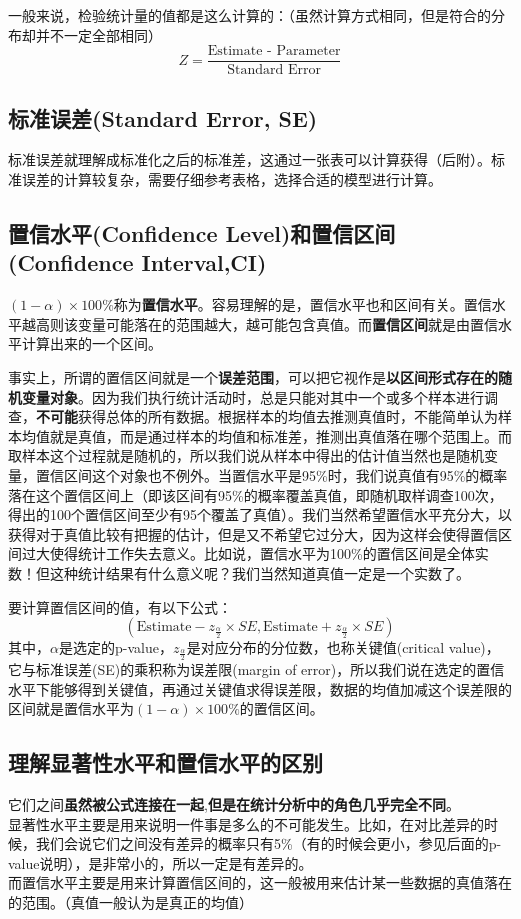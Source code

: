 \documentclass[UTF8]{ctexbook}
\begin{document}
一般来说，检验统计量的值都是这么计算的：（虽然计算方式相同，但是符合的分布却并不一定全部相同）
\[
Z=\frac{\text{Estimate\ -\ Parameter}}{\text{Standard Error}}
\]
\subsection{标准误差(Standard Error, SE)}
标准误差就理解成标准化之后的标准差，这通过一张表可以计算获得（后附）。标准误差的计算较复杂，需要仔细参考表格，选择合适的模型进行计算。
\subsection{置信水平(Confidence Level)和置信区间(Confidence Interval,CI)}
$(1-\alpha)\times 100\%$称为\textbf{置信水平}。容易理解的是，置信水平也和区间有关。置信水平越高则该变量可能落在的范围越大，越可能包含真值。而\textbf{置信区间}就是由置信水平计算出来的一个区间。

事实上，所谓的置信区间就是一个\textbf{误差范围}，可以把它视作是\textbf{以区间形式存在的随机变量对象}。因为我们执行统计活动时，总是只能对其中一个或多个样本进行调查，\textbf{不可能}获得总体的所有数据。根据样本的均值去推测真值时，不能简单认为样本均值就是真值，而是通过样本的均值和标准差，推测出真值落在哪个范围上。而取样本这个过程就是随机的，所以我们说从样本中得出的估计值当然也是随机变量，置信区间这个对象也不例外。当置信水平是95\%时，我们说真值有95\%的概率落在这个置信区间上（即该区间有95\%的概率覆盖真值，即随机取样调查100次，得出的100个置信区间至少有95个覆盖了真值）。我们当然希望置信水平充分大，以获得对于真值比较有把握的估计，但是又不希望它过分大，因为这样会使得置信区间过大使得统计工作失去意义。比如说，置信水平为100\%的置信区间是全体实数！但这种统计结果有什么意义呢？我们当然知道真值一定是一个实数了。

要计算置信区间的值，有以下公式：
\[
\left(\text{Estimate}-z_{\frac{\alpha}{2}}\times SE,\text{Estimate}+z_{\frac{\alpha}{2}}\times SE\right)
\]
其中，$\alpha$是选定的p-value，$z_{\frac{\alpha}{2}}$是对应分布的分位数，也称关键值(critical value)，它与标准误差(SE)的乘积称为误差限(margin of error)，所以我们说在选定的置信水平下能够得到关键值，再通过关键值求得误差限，数据的均值加减这个误差限的区间就是置信水平为$(1-\alpha)\times 100\%$的置信区间。

\subsection{理解显著性水平和置信水平的区别}
它们之间\textbf{虽然被公式连接在一起},\textbf{但是在统计分析中的角色几乎完全不同}。\\
\indent 显著性水平主要是用来说明一件事是多么的不可能发生。比如，在对比差异的时候，我们会说它们之间没有差异的概率只有5\%（有的时候会更小，参见后面的p-value说明），是非常小的，所以一定是有差异的。\\
\indent 而置信水平主要是用来计算置信区间的，这一般被用来估计某一些数据的真值落在的范围。（真值一般认为是真正的均值）
\end{document}
